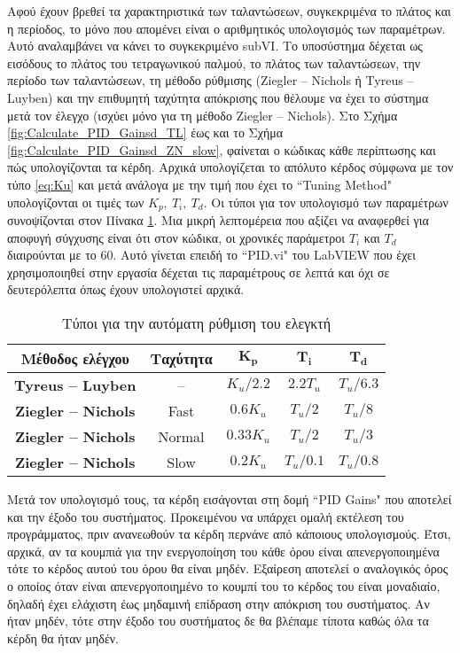 Αφού έχουν βρεθεί τα χαρακτηριστικά των ταλαντώσεων, συγκεκριμένα το πλάτος και η περίοδος, το μόνο που απομένει είναι ο αριθμητικός υπολογισμός των παραμέτρων. Αυτό αναλαμβάνει να κάνει το συγκεκριμένο subVI. Το υποσύστημα δέχεται ως εισόδους το πλάτος του τετραγωνικού παλμού, το πλάτος των ταλαντώσεων, την περίοδο των ταλαντώσεων, τη μέθοδο ρύθμισης (Ziegler -- Nichols ή Tyreus -- Luyben) και την επιθυμητή ταχύτητα απόκρισης που θέλουμε να έχει το σύστημα μετά τον έλεγχο (ισχύει μόνο για τη μέθοδο Ziegler -- Nichols). Στο Σχήμα \ref{fig:Calculate_PID_Gainsd_TL} έως και το Σχήμα \ref{fig:Calculate_PID_Gainsd_ZN_slow}, φαίνεται ο κώδικας κάθε περίπτωσης και πώς υπολογίζονται τα κέρδη. Αρχικά υπολογίζεται το απόλυτο κέρδος σύμφωνα με τον τύπο \ref{eq:Ku} και μετά ανάλογα με την τιμή που έχει το ``Tuning Method" υπολογίζονται οι τιμές των $K_p,\ T_i,\ T_d$. Οι τύποι για τον υπολογισμό των παραμέτρων συνοψίζονται στον Πίνακα \ref{table:autotuning_parameters}. Μια μικρή λεπτομέρεια που αξίζει να αναφερθεί για αποφυγή σύγχυσης είναι ότι στον κώδικα, οι χρονικές παράμετροι $T_i$ και $T_d$ διαιρούνται με το $60$. Αυτό γίνεται επειδή το ``PID.vi" του LabVIEW που έχει χρησιμοποιηθεί στην εργασία δέχεται τις παραμέτρους σε λεπτά και όχι σε δευτερόλεπτα όπως έχουν υπολογιστεί αρχικά. 

\begin{table}[h]
\begin{center}
	\begin{tabular}{|c|c|c|c|c|}
	\hline 
	\textbf{Μέθοδος ελέγχου} & \textbf{Ταχύτητα} & $\mathbf{K_p}$ & $\mathbf{T_i}$ & $\mathbf{T_d}$ \\ 
	\hline 
	\textbf{Tyreus -- Luyben} & -- & $K_u/2.2$ & $2.2T_u$ & $T_u/6.3$ \\ 
	\hline
	\textbf{Ziegler -- Nichols} & Fast & $0.6K_u$ & $T_u/2$ & $T_u/8$ \\
	\hline
	\textbf{Ziegler -- Nichols} & Normal & $0.33K_u$ & $T_u/2$ & $T_u/3$ \\
	\hline
	\textbf{Ziegler -- Nichols} & Slow & $0.2K_u$ & $T_u/0.1$ & $T_u/0.8$ \\
	\hline
	\end{tabular} 
\caption{Τύποι για την αυτόματη ρύθμιση του ελεγκτή}
\label{table:autotuning_parameters}
\end{center}
\end{table}

Μετά τον υπολογισμό τους, τα κέρδη εισάγονται στη δομή ``PID Gains" που αποτελεί και την έξοδο του συστήματος. Προκειμένου να υπάρχει ομαλή εκτέλεση του προγράμματος, πριν ανανεωθούν τα κέρδη περνάνε από κάποιους υπολογισμούς. Έτσι, αρχικά, αν τα κουμπιά για την ενεργοποίηση του κάθε όρου είναι απενεργοποιημένα τότε το κέρδος αυτού του όρου θα είναι μηδέν. Εξαίρεση αποτελεί ο αναλογικός όρος ο οποίος όταν είναι απενεργοποιημένο το κουμπί του το κέρδος του είναι μοναδιαίο, δηλαδή έχει ελάχιστη έως μηδαμινή επίδραση στην απόκριση του συστήματος. Αν ήταν μηδέν, τότε στην έξοδο του συστήματος δε θα βλέπαμε τίποτα καθώς όλα τα κέρδη θα ήταν μηδέν.

